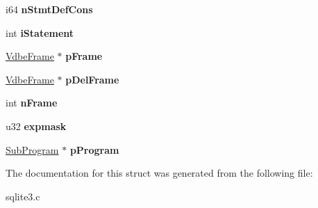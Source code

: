 \begin{DoxyCompactItemize}
\item 
\hypertarget{struct_vdbe_ab6a710cd4796c6adc8967e7b5bf35757}{i64 {\bfseries n\-Stmt\-Def\-Cons}}\label{struct_vdbe_ab6a710cd4796c6adc8967e7b5bf35757}

\item 
\hypertarget{struct_vdbe_ae2b5893f3d37e004acac58bffee1a229}{int {\bfseries i\-Statement}}\label{struct_vdbe_ae2b5893f3d37e004acac58bffee1a229}

\item 
\hypertarget{struct_vdbe_afd754aaedd6cd5b229fbeff33177fe04}{\hyperlink{struct_vdbe_frame}{Vdbe\-Frame} $\ast$ {\bfseries p\-Frame}}\label{struct_vdbe_afd754aaedd6cd5b229fbeff33177fe04}

\item 
\hypertarget{struct_vdbe_ab8f22136c8bdb4c02962a1ae081e9116}{\hyperlink{struct_vdbe_frame}{Vdbe\-Frame} $\ast$ {\bfseries p\-Del\-Frame}}\label{struct_vdbe_ab8f22136c8bdb4c02962a1ae081e9116}

\item 
\hypertarget{struct_vdbe_a27fbd083a0335ac2b332d37ea2b90bdc}{int {\bfseries n\-Frame}}\label{struct_vdbe_a27fbd083a0335ac2b332d37ea2b90bdc}

\item 
\hypertarget{struct_vdbe_a5e22eedb6ee963a0bcf27fc9fd8b8e43}{u32 {\bfseries expmask}}\label{struct_vdbe_a5e22eedb6ee963a0bcf27fc9fd8b8e43}

\item 
\hypertarget{struct_vdbe_a9239ea72573142101328be15c90de62b}{\hyperlink{struct_sub_program}{Sub\-Program} $\ast$ {\bfseries p\-Program}}\label{struct_vdbe_a9239ea72573142101328be15c90de62b}

\end{DoxyCompactItemize}


The documentation for this struct was generated from the following file\-:\begin{DoxyCompactItemize}
\item 
sqlite3.\-c\end{DoxyCompactItemize}
